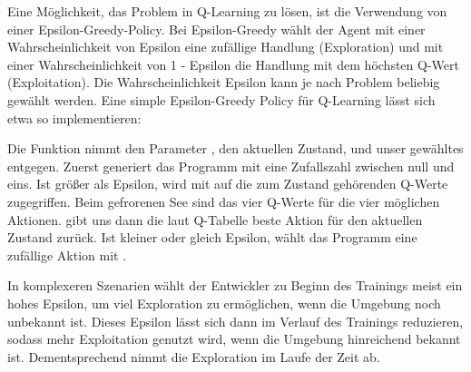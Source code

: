 Eine Möglichkeit, das Problem in Q-Learning zu lösen, ist die Verwendung von einer Epsilon-Greedy-Policy. Bei Epsilon-Greedy wählt der Agent mit einer Wahrscheinlichkeit von Epsilon eine zufällige Handlung (Exploration) und mit einer Wahrscheinlichkeit von 1 - Epsilon die Handlung mit dem höchsten Q-Wert (Exploitation). Die Wahrscheinlichkeit Epsilon kann je nach Problem beliebig gewählt werden. Eine simple Epsilon-Greedy Policy für Q-Learning lässt sich etwa so implementieren:

\medskip



\PYTHON{}




\PYTHON{}





\medskip

Die Funktion nimmt den Parameter , den aktuellen Zustand, und unser gewähltes  entgegen. Zuerst generiert das Programm mit  eine Zufallszahl  zwischen null und eins. Ist  größer als Epsilon, wird mit  auf die zum Zustand gehörenden Q-Werte zugegriffen. Beim gefrorenen See sind das vier Q-Werte für die vier möglichen Aktionen.  gibt uns dann die laut Q-Tabelle beste Aktion für den aktuellen Zustand zurück. Ist  kleiner oder gleich Epsilon, wählt das Programm eine zufällige Aktion mit .

In komplexeren Szenarien wählt der Entwickler zu Beginn des Trainings meist ein hohes Epsilon, um viel Exploration zu ermöglichen, wenn die Umgebung noch unbekannt ist. Dieses Epsilon lässt sich dann im Verlauf des Trainings reduzieren, sodass mehr Exploitation genutzt wird, wenn die Umgebung hinreichend bekannt ist. Dementsprechend nimmt die Exploration im Laufe der Zeit ab.

